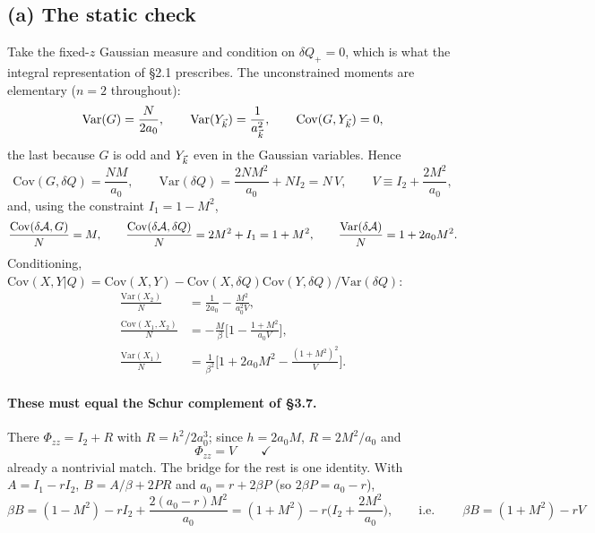\subsection{(a) The static check}
Take the fixed-$z$ Gaussian measure and condition on $\delta Q_+=0$, which is what the
integral representation of \S2.1 prescribes. The unconstrained moments are elementary
($n=2$ throughout):
\begin{equation}
  \mathrm{Var}(G)=\frac{N}{2a_0},\qquad
  \mathrm{Var}(Y_{\vec k})=\frac{1}{a_{\vec k}^{2}},\qquad
  \mathrm{Cov}(G,Y_{\vec k})=0 ,
\end{equation}
the last because $G$ is odd and $Y_{\vec k}$ even in the Gaussian variables. Hence
\begin{equation}
  \mathrm{Cov}(G,\delta Q)=\frac{NM}{a_0},\qquad
  \mathrm{Var}(\delta Q)=\frac{2NM^{2}}{a_0}+NI_2=N\,V,
  \qquad V\equiv I_2+\frac{2M^{2}}{a_0},
\end{equation}
and, using the constraint $I_1=1-M^{2}$,
\begin{equation}
  \frac{\mathrm{Cov}(\delta\mathcal{A},G)}{N}=M,\qquad
  \frac{\mathrm{Cov}(\delta\mathcal{A},\delta Q)}{N}=2M^{2}+I_1=1+M^{2},\qquad
  \frac{\mathrm{Var}(\delta\mathcal{A})}{N}=1+2a_0M^{2} .
\end{equation}
Conditioning, $\mathrm{Cov}(X,Y|Q)=\mathrm{Cov}(X,Y)-\mathrm{Cov}(X,\delta Q)\mathrm{Cov}(Y,\delta Q)/\mathrm{Var}(\delta Q)$:
\begin{equation}
  \boxed{
  \begin{aligned}
  \frac{\mathrm{Var}(X_2)}{N}&=\frac{1}{2a_0}-\frac{M^{2}}{a_0^{2}V},\\
  \frac{\mathrm{Cov}(X_1,X_2)}{N}&=-\frac{M}{\beta}\Big[1-\frac{1+M^{2}}{a_0V}\Big],\\
  \frac{\mathrm{Var}(X_1)}{N}&=\frac{1}{\beta^{2}}\Big[1+2a_0M^{2}-\frac{(1+M^{2})^{2}}{V}\Big].
  \end{aligned}}
  \label{eq:fluct7}
\end{equation}

\paragraph{These must equal the Schur complement of \S3.7.} There
$\Phi_{zz}=I_2+R$ with $R=h^{2}/2a_0^{3}$; since $h=2a_0M$, $R=2M^{2}/a_0$ and
\begin{equation}
  \Phi_{zz}=V \qquad\checkmark
\end{equation}
already a nontrivial match. The bridge for the rest is one identity. With
$A=I_1-rI_2$, $B=A/\beta+2PR$ and $a_0=r+2\beta P$ (so $2\beta P=a_0-r$),
\begin{equation}
  \beta B=(1-M^{2})-rI_2+\frac{2(a_0-r)M^{2}}{a_0}
   =(1+M^{2})-r\Big(I_2+\frac{2M^{2}}{a_0}\Big),
  \qquad\text{i.e.}\qquad
  \boxed{\ \beta B=(1+M^{2})-rV\ }
  \label{eq:bridge}
\end{equation}

